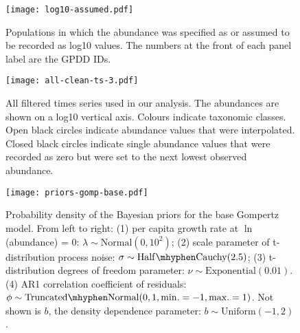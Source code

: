 \documentclass[12pt]{article}
\begin{document}
\renewcommand{\thefigure}{S\arabic{figure}}
\setcounter{figure}{0}

\begin{figure}[htbp]
\begin{center}
\texttt{[image: log10-assumed.pdf]} \caption{Populations in which the abundance was specified as or assumed to be recorded as log10 values. The numbers at the front of each panel label are the GPDD IDs.}
    \label{fig:log10-assumed}
\end{center}
\end{figure}

\begin{figure}[htbp]
\begin{center}
\texttt{[image: all-clean-ts-3.pdf]} \caption{All filtered times series used in our analysis. The abundances are shown on a log10 vertical axis. Colours indicate taxonomic classes. Open black circles indicate abundance values that were interpolated. Closed black circles indicate single abundance values that were recorded as zero but were set to the next lowest observed abundance.}
    \label{fig:all-ts}
\end{center}
\end{figure}

\clearpage

\begin{figure}[htbp]
\begin{center}
\texttt{[image: priors-gomp-base.pdf]} \caption{Probability
  density of the Bayesian priors for the base Gompertz model. From left to right: (1) per capita growth
  rate at $\ln$(abundance) = $0$: $\lambda \sim \mathrm{Normal}(0, 10^2)$; (2) scale
  parameter of t-distribution process noise: $\sigma \sim \mathrm{Half\mhyphen
    Cauchy} (2.5)$; (3) t-distribution degrees of freedom parameter: $\nu \sim
  \mathrm{Exponential}(0.01)$. (4) AR1 correlation coefficient of residuals: $\phi \sim \mathrm{Truncated \mhyphen Normal}(0, 1, \mathrm{min.} = -1, \mathrm{max.} = 1)$. Not shown is $b$, the density dependence
  parameter: $b \sim \mathrm{Uniform}(-1, 2)$.}
  \label{fig:priors}
\end{center}
\end{figure}

\clearpage
\end{document}
